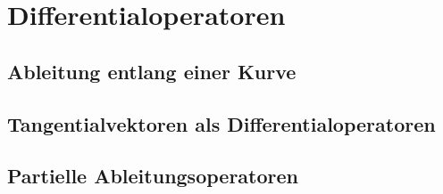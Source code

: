 %
%
%
\section{Differentialoperatoren
\label{buch:koordinaten:section:differentialoperatoren}}

\subsection{Ableitung entlang einer Kurve}

\subsection{Tangentialvektoren als Differentialoperatoren}

\subsection{Partielle Ableitungsoperatoren}

